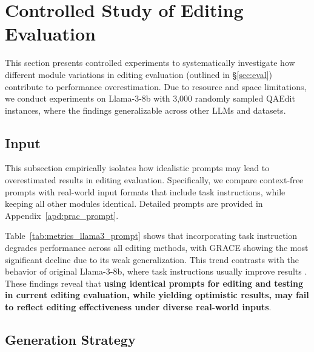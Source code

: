 
\section{Controlled Study of Editing Evaluation}
\label{sec:cont_exp}





This section presents controlled experiments to systematically investigate how different module variations in editing evaluation (outlined in \S\ref{sec:eval}) contribute to performance overestimation.
Due to resource and space limitations, we conduct experiments on Llama-3-8b with 3,000 randomly sampled QAEdit instances, where the findings generalizable across other LLMs and datasets.






\subsection{Input}
\label{analysis:input}



This subsection empirically isolates how idealistic prompts may lead to overestimated results in editing evaluation.
Specifically, we compare context-free prompts with real-world input formats that include task instructions, while keeping all other modules identical. 
Detailed prompts are provided in Appendix~\ref{apd:prac_prompt}.



Table~\ref{tab:metrics_llama3_prompt} shows that incorporating task instruction degrades performance across all editing methods, with GRACE showing the most significant decline due to its weak generalization.
This trend contrasts with the behavior of original Llama-3-8b, where task instructions usually improve results \cite{grattafiori2024llama3herdmodels}.
These findings reveal that \textbf{using identical prompts for editing and testing in current editing evaluation, while yielding optimistic results, may fail to reflect editing effectiveness under diverse real-world inputs}.







\subsection{Generation Strategy}






